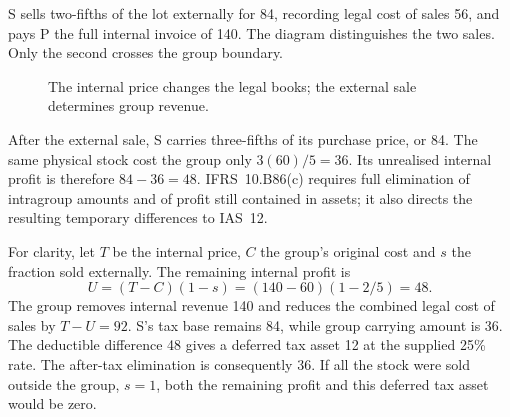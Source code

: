 S sells two-fifths of the lot externally for 84, recording legal cost of sales
56, and pays P the full internal invoice of 140. The diagram distinguishes the
two sales. Only the second crosses the group boundary.

\begin{figure}[htbp]
\centering
{}
\caption{The internal price changes the legal books; the external sale determines group revenue.}
\end{figure}

After the external sale, S carries three-fifths of its purchase price, or 84.
The same physical stock cost the group only \(3(60)/5=36\). Its unrealised
internal profit is therefore \(84-36=48\). IFRS~10.B86(c) requires full
elimination of intragroup amounts and of profit still contained in assets; it
also directs the resulting temporary differences to IAS~12.

For clarity, let \(T\) be the internal price, \(C\) the group's original cost
and \(s\) the fraction sold externally. The remaining internal profit is
\begin{equation}
 U=(T-C)(1-s)=(140-60)(1-2/5)=48.
 \label{eq:joined-unrealised}
\end{equation}
The group removes internal revenue 140 and reduces the combined legal cost of
sales by \(T-U=92\). S's tax base remains 84, while group carrying amount is
36. The deductible difference 48 gives a deferred tax asset 12 at the supplied
25\% rate. The after-tax elimination is consequently 36. If all the stock were
sold outside the group, \(s=1\), both the remaining profit and this deferred
tax asset would be zero.

